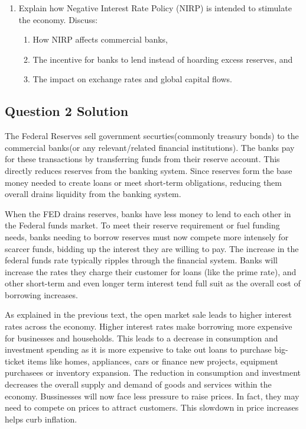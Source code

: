 \begin{enumerate}
\begin{enumerate}
        \item Explain how Negative Interest Rate Policy (NIRP) is intended to
        stimulate the economy. Discuss:
        \begin{enumerate}
            \item How NIRP affects commercial banks,
            \item The incentive for banks to lend instead of hoarding excess
            reserves, and
            \item The impact on exchange rates and global capital flows.
        \end{enumerate}
    \end{enumerate}

\end{enumerate}

\subsection{Question 2 Solution}

The Federal Reserves sell government securties(commonly treasury bonds) to the commercial banks(or any relevant/related financial institutions). 
The banks pay for these transactions by transferring funds from their reserve account. This directly reduces reserves from the banking system. Since 
reserves form the base money needed to create loans or meet short-term obligations, reducing them overall drains liquidity from the banking system. 

When the FED drains reserves, banks have less money to lend to each other in the Federal funds market. To meet their reserve requirement or fuel funding needs, banks 
needing to borrow reserves must now compete more intensely for scarcer funds, bidding up the interest they are willing to pay. The increase in the federal funds rate 
typically ripples through the financial system. Banks will increase the rates they charge their customer for loans (like the prime rate), and other short-term and even
longer term interest tend full suit as the overall cost of borrowing increases.

As explained in the previous text, the open market sale leads to higher interest rates across the economy. Higher interest rates make borrowing more expensive for businesses and households. 
This leads to a decrease in consumption and investment spending as it is more expensive to take out loans to purchase big-ticket items like homes, appliances, cars or finance new projects, equipment purchasees 
or inventory expansion. The reduction in consumption and investment decreases the overall supply and demand of goods and services within the economy. Bussinesses will now face less pressure to raise prices. In fact, 
they may need to compete on prices to attract customers. This slowdown in price increases helps curb inflation. 




